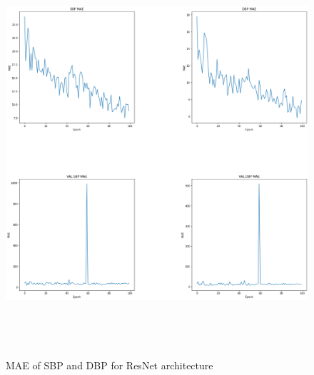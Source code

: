 \begin{figure}[H]
    \centering
    \includegraphics[width=15cm,height=15cm,keepaspectratio]{Results/resnet.png}
    \caption{MAE of SBP and DBP for ResNet architecture}
    \label{resnetResults}
\end{figure}